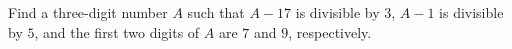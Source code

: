 Find a three-digit number $A$ such that $A-17$ is divisible by $3$, $A-1$ is divisible by $5$, and the first two digits of $A$ are $7$ and $9$, respectively.
